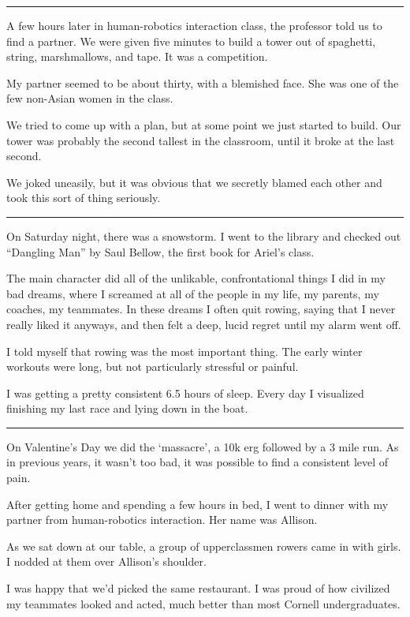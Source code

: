 \plainfancybreak{12pt}{2}{}

A few hours later in human-robotics interaction class, the professor told us to
find a partner. We were given five minutes to build a tower out of spaghetti,
string, marshmallows, and tape.  It was a competition.

My partner seemed to be about thirty, with a blemished face. She was one of the
few non-Asian women in the class.

We tried to come up with a plan, but at some point we just started to build. Our
tower was probably the second tallest in the classroom, until it broke at the
last second.

We joked uneasily, but it was obvious that we secretly blamed each other and
took this sort of thing seriously.

\plainfancybreak{12pt}{2}{}

On Saturday night, there was a snowstorm.  I went to the library and checked out
``Dangling Man'' by Saul Bellow, the first book for Ariel's class.

The main character did all of the unlikable, confrontational things I did in my
bad dreams, where I screamed at all of the people in my life, my parents, my
coaches, my teammates.  In these dreams I often quit rowing, saying that I never
really liked it anyways, and then felt a deep, lucid regret until my alarm
went off.

I told myself that rowing was the most important thing.  The early winter
workouts were long, but not particularly stressful or painful.

I was getting a pretty consistent 6.5 hours of sleep.  Every day I visualized
finishing my last race and lying down in the boat.

\plainfancybreak{12pt}{2}{}

On Valentine's Day we did the `massacre', a 10k erg followed by a 3 mile run.
As in previous years, it wasn't too bad, it was possible to find a consistent
level of pain.

After getting home and spending a few hours in bed, I went to dinner with my
partner from human-robotics interaction.  Her name was Allison.

As we sat down at our table, a group of upperclassmen rowers came in with girls.
I nodded at them over Allison's shoulder.

I was happy that we'd picked the same restaurant.  I was proud of how civilized
my teammates looked and acted, much better than most Cornell undergraduates.


